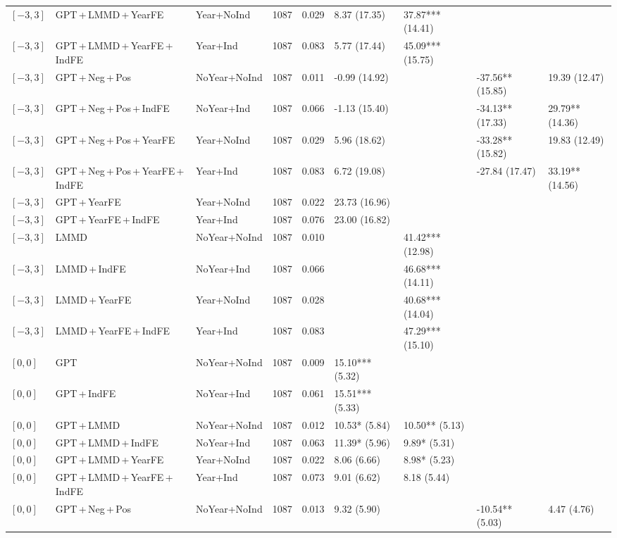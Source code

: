 \begin{table}[p]
\begin{tabular}{lllrrllll}
$[-3,3]$ & GPT\,+\,LMMD\,+\,YearFE & Year+NoInd & 1087 & 0.029 & 8.37 (17.35) & 37.87*** (14.41) &  &  \\
$[-3,3]$ & GPT\,+\,LMMD\,+\,YearFE\,+\,IndFE & Year+Ind & 1087 & 0.083 & 5.77 (17.44) & 45.09*** (15.75) &  &  \\
$[-3,3]$ & GPT\,+\,Neg\,+\,Pos & NoYear+NoInd & 1087 & 0.011 & -0.99 (14.92) &  & -37.56** (15.85) & 19.39 (12.47) \\
$[-3,3]$ & GPT\,+\,Neg\,+\,Pos\,+\,IndFE & NoYear+Ind & 1087 & 0.066 & -1.13 (15.40) &  & -34.13** (17.33) & 29.79** (14.36) \\
$[-3,3]$ & GPT\,+\,Neg\,+\,Pos\,+\,YearFE & Year+NoInd & 1087 & 0.029 & 5.96 (18.62) &  & -33.28** (15.82) & 19.83 (12.49) \\
$[-3,3]$ & GPT\,+\,Neg\,+\,Pos\,+\,YearFE\,+\,IndFE & Year+Ind & 1087 & 0.083 & 6.72 (19.08) &  & -27.84 (17.47) & 33.19** (14.56) \\
$[-3,3]$ & GPT\,+\,YearFE & Year+NoInd & 1087 & 0.022 & 23.73 (16.96) &  &  &  \\
$[-3,3]$ & GPT\,+\,YearFE\,+\,IndFE & Year+Ind & 1087 & 0.076 & 23.00 (16.82) &  &  &  \\
$[-3,3]$ & LMMD & NoYear+NoInd & 1087 & 0.010 &  & 41.42*** (12.98) &  &  \\
$[-3,3]$ & LMMD\,+\,IndFE & NoYear+Ind & 1087 & 0.066 &  & 46.68*** (14.11) &  &  \\
$[-3,3]$ & LMMD\,+\,YearFE & Year+NoInd & 1087 & 0.028 &  & 40.68*** (14.04) &  &  \\
$[-3,3]$ & LMMD\,+\,YearFE\,+\,IndFE & Year+Ind & 1087 & 0.083 &  & 47.29*** (15.10) &  &  \\
$[0,0]$ & GPT & NoYear+NoInd & 1087 & 0.009 & 15.10*** (5.32) &  &  &  \\
$[0,0]$ & GPT\,+\,IndFE & NoYear+Ind & 1087 & 0.061 & 15.51*** (5.33) &  &  &  \\
$[0,0]$ & GPT\,+\,LMMD & NoYear+NoInd & 1087 & 0.012 & 10.53* (5.84) & 10.50** (5.13) &  &  \\
$[0,0]$ & GPT\,+\,LMMD\,+\,IndFE & NoYear+Ind & 1087 & 0.063 & 11.39* (5.96) & 9.89* (5.31) &  &  \\
$[0,0]$ & GPT\,+\,LMMD\,+\,YearFE & Year+NoInd & 1087 & 0.022 & 8.06 (6.66) & 8.98* (5.23) &  &  \\
$[0,0]$ & GPT\,+\,LMMD\,+\,YearFE\,+\,IndFE & Year+Ind & 1087 & 0.073 & 9.01 (6.62) & 8.18 (5.44) &  &  \\
$[0,0]$ & GPT\,+\,Neg\,+\,Pos & NoYear+NoInd & 1087 & 0.013 & 9.32 (5.90) &  & -10.54** (5.03) & 4.47 (4.76) \\

\end{tabular}
\end{table}
